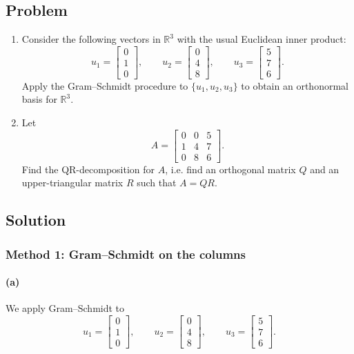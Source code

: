 \documentclass[12pt]{article}
\newcommand{\R}{\mathbb{R}}
\begin{document}
\subsection{Problem}
\begin{enumerate}[label=(\alph*)]
  \item Consider the following vectors in $\R^3$ with the usual Euclidean inner product:
  \[
  u_1=\begin{bmatrix}0\\1\\0\end{bmatrix},
  \qquad
  u_2=\begin{bmatrix}0\\4\\8\end{bmatrix},
  \qquad
  u_3=\begin{bmatrix}5\\7\\6\end{bmatrix}.
  \]
  Apply the Gram--Schmidt procedure to $\{u_1,u_2,u_3\}$ to obtain an orthonormal basis for $\R^3$.
  \item Let
  \[
  A=\begin{bmatrix}0&0&5\\1&4&7\\0&8&6\end{bmatrix}.
  \]
  Find the QR-decomposition for $A$, i.e. find an orthogonal matrix $Q$ and an upper-triangular matrix $R$ such that $A=QR$.
\end{enumerate}

\subsection{Solution}


\subsubsection{Method 1: Gram--Schmidt on the columns}

\paragraph{(a)}
We apply Gram--Schmidt to
\[
u_1=\begin{bmatrix}0\\1\\0\end{bmatrix},
\qquad
u_2=\begin{bmatrix}0\\4\\8\end{bmatrix},
\qquad
u_3=\begin{bmatrix}5\\7\\6\end{bmatrix}.
\]
\end{document}
